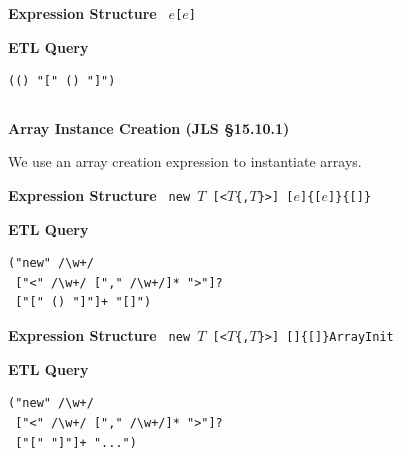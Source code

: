 \begin{chapterBody}
\begin{minipage}[t]{.45\linewidth}
\textbf{Expression Structure} \hfill\break
\texttt{
$e${\color{bp-blue}[}$e${\color{bp-blue}]}
}
\end{minipage}
\begin{minipage}[t]{.45\linewidth}
\textbf{ETL Query}
\begin{lstlisting}[language=etl]
(() "[" () "]")
\end{lstlisting}
\end{minipage}

\begin{lstlisting}[language=etl]
\end{lstlisting}

\noindent\textbf{Array Instance Creation (JLS \S15.10.1)}

We use an array creation expression to instantiate arrays.
\vspace{1em}

\begin{minipage}[t]{.45\linewidth}
\textbf{Expression Structure} \hfill\break
\texttt{
{\color{bp-blue}new} $T$
\hfill\break\hspace*{0.25em}
[{\color{bp-blue}<}$T$\{,$T$\}{\color{bp-blue}>}]
\hfill\break\hspace*{0.25em}
{\color{bp-blue}[}$e${\color{bp-blue}]}\{{\color{bp-blue}[}$e${\color{bp-blue}]}\}\{{\color{bp-blue}[]}\}
}
\end{minipage}
\begin{minipage}[t]{.45\linewidth}
\textbf{ETL Query}
\begin{lstlisting}[language=etl]
("new" /\w+/
 ["<" /\w+/ ["," /\w+/]* ">"]?
 ["[" () "]"]+ "[]")
\end{lstlisting}
\end{minipage}

\begin{minipage}[t]{.45\linewidth}
\textbf{Expression Structure} \hfill\break
\texttt{
{\color{bp-blue}new} $T$
\hfill\break\hspace*{0.25em}
[{\color{bp-blue}<}$T$\{,$T$\}{\color{bp-blue}>}]
\hfill\break\hspace*{0.25em}
{\color{bp-blue}[]}\{{\color{bp-blue}[]}\}ArrayInit
}
\end{minipage}
\begin{minipage}[t]{.45\linewidth}
\textbf{ETL Query}
\begin{lstlisting}[language=etl]
("new" /\w+/
 ["<" /\w+/ ["," /\w+/]* ">"]?
 ["[" "]"]+ "...")
\end{lstlisting}
\end{minipage}


\end{chapterBody}
